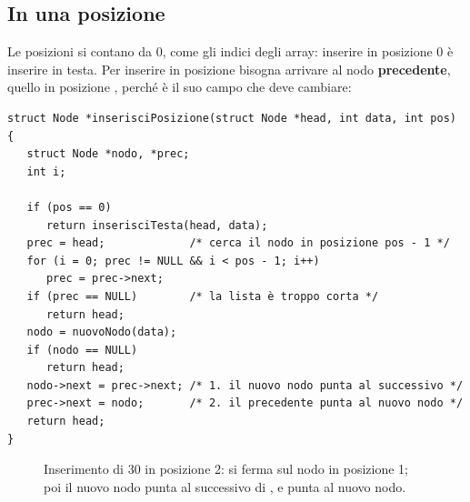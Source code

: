 \subsection{In una posizione}

Le posizioni si contano da 0, come gli indici degli array: inserire in
posizione 0 è inserire in testa. Per inserire in posizione  bisogna
arrivare al nodo \textbf{precedente}, quello in posizione ,
perché è il suo campo  che deve cambiare:

\begin{lstlisting}[style=c, name=lista.c]
struct Node *inserisciPosizione(struct Node *head, int data, int pos)
{
   struct Node *nodo, *prec;
   int i;

   if (pos == 0)
      return inserisciTesta(head, data);
   prec = head;             /* cerca il nodo in posizione pos - 1 */
   for (i = 0; prec != NULL && i < pos - 1; i++)
      prec = prec->next;
   if (prec == NULL)        /* la lista è troppo corta */
      return head;
   nodo = nuovoNodo(data);
   if (nodo == NULL)
      return head;
   nodo->next = prec->next; /* 1. il nuovo nodo punta al successivo */
   prec->next = nodo;       /* 2. il precedente punta al nuovo nodo */
   return head;
}
\end{lstlisting}

\begin{figure}[H]
  \centering
  \caption{Inserimento di 30 in posizione 2:  si ferma sul nodo
           in posizione 1; poi il nuovo nodo punta al successivo di
           , e  punta al nuovo nodo.}
  \label{fig:ins-pos}
\end{figure}

